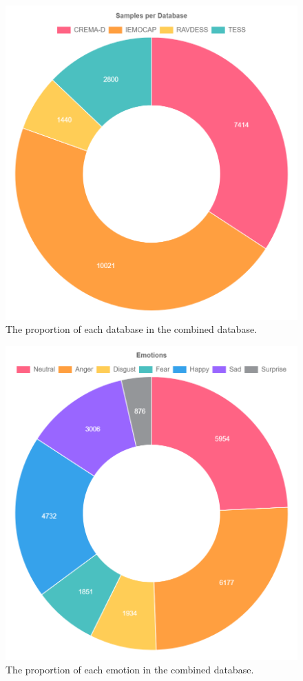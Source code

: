 \documentclass[conference]{IEEEtran}
\begin{document}
\begin{figure}[h!]
	\centering
	\hspace{6mm}
	\includegraphics[width=\linewidth]{combined_db_db_split.png} 
	\caption{The proportion of each database in the combined database.}
	\label{fig:combined_db_db_split}
\end{figure}

\begin{figure}[h!]
	\centering
	\hspace{6mm}
	\includegraphics[width=\linewidth]{combined_db_emotions.png} 
	\caption{The proportion of each emotion in the combined database.}
	\label{fig:combined_db_db_split}
\end{figure}
\end{document}
